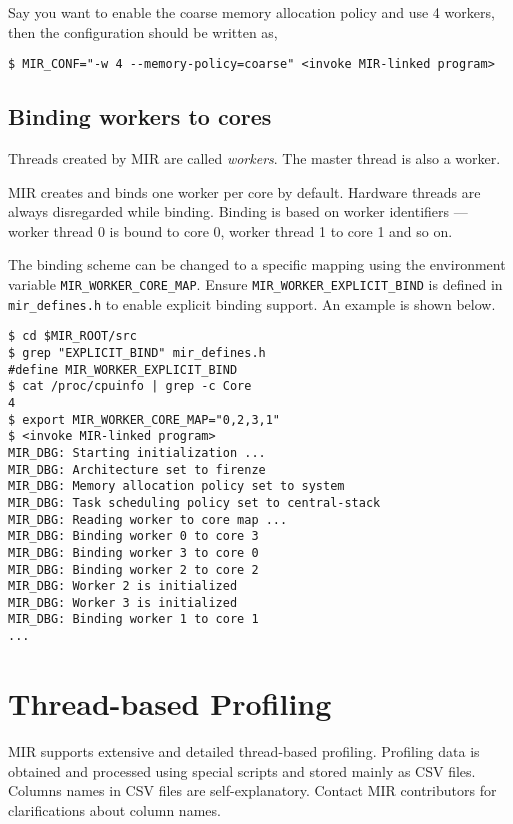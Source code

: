 \documentclass[11pt,a4paper]{article}
\begin{document}
Say you want to enable the coarse memory allocation policy and use 4 workers, then the configuration should be written as,

\begin{lstlisting}[style=MyInputStyle]
$ MIR_CONF="-w 4 --memory-policy=coarse" <invoke MIR-linked program>
\end{lstlisting}

\subsection{Binding workers to cores}\label{sec:binding-workers-to-cores}
Threads created by MIR are called \textit{workers}. The master thread is also a worker.

MIR creates and binds one worker per core by default. Hardware threads are always disregarded while binding. Binding is based on worker identifiers --- worker thread 0 is bound to core 0, worker thread 1 to core 1 and so on.

The binding scheme can be changed to a specific mapping using the environment variable \texttt{MIR\_WORKER\_CORE\_MAP}. Ensure \texttt{MIR\_WORKER\_EXPLICIT\_BIND} is defined in \texttt{mir\_defines.h} to enable explicit binding support. An example is shown below.

\begin{lstlisting}[style=MyInputStyle]
$ cd $MIR_ROOT/src
$ grep "EXPLICIT_BIND" mir_defines.h
#define MIR_WORKER_EXPLICIT_BIND
$ cat /proc/cpuinfo | grep -c Core
4
$ export MIR_WORKER_CORE_MAP="0,2,3,1"
$ <invoke MIR-linked program>
MIR_DBG: Starting initialization ...
MIR_DBG: Architecture set to firenze
MIR_DBG: Memory allocation policy set to system
MIR_DBG: Task scheduling policy set to central-stack
MIR_DBG: Reading worker to core map ...
MIR_DBG: Binding worker 0 to core 3
MIR_DBG: Binding worker 3 to core 0
MIR_DBG: Binding worker 2 to core 2
MIR_DBG: Worker 2 is initialized
MIR_DBG: Worker 3 is initialized
MIR_DBG: Binding worker 1 to core 1
...
\end{lstlisting}

\section{Thread-based Profiling}\label{sec:thread-based-profiling}

MIR supports extensive and detailed thread-based profiling. Profiling data is obtained and processed using special scripts and stored mainly as CSV files. Columns names in CSV files are self-explanatory. Contact MIR contributors for clarifications about column names.
\end{document}
